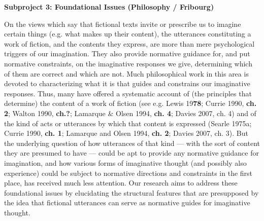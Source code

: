 

\vspace{.2cm}
\noindent\textbf{Subproject 3: Foundational Issues (Philosophy / Fribourg)}
\vspace{.2cm}


\vspace{.2cm}
\noindent On the views which say that fictional texts invite or prescribe us to imagine certain things (e.g. what makes up their content), the utterances constituting a work of fiction, and the contents they express, are more than mere psychological triggers of our imagination. They also provide normative guidance for, and put normative constraints, on the imaginative responses we give, determining which of them are correct and which are not. Much philosophical work in this area is devoted to characterizing what it is that guides and constrains our imaginative responses. Thus, many have offered a systematic account of (the principles that determine) the content of a work of fiction (see e.g. Lewis 19\textbf{78}; Currie 1990, \textbf{ch. 2}; Walton 1990, \textbf{ch.?}; Lamarque \& Olsen 1994, \textbf{ch. 4}; Davies 2007, ch. 4) and of the kind of acts or utterances by which that content is expressed (Searle 1975a; Currie 1990, \textbf{ch. 1}; Lamarque and Olsen 1994, \textbf{ch. 2}; Davies 2007, ch. 3). But the underlying question of how utterances of that kind --- with the sort of content they are presumed to have --- could be apt to provide any normative guidance for imagination, and how various forms of imaginative thought (and possibly also experience) could be subject to normative directions and constraints in the first place, has received much less attention. Our research aims to address these foundational issues by elucidating the structural features that are presupposed by the idea that fictional utterances can serve as normative guides for imaginative thought.

